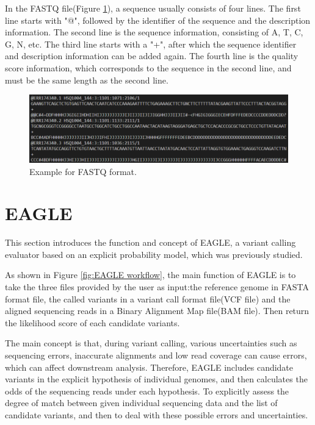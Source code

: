 \documentclass[PhD]{PHlab-thesis}
\begin{document}
In the FASTQ file(Figure \ref{fig:FASTQ format}), a sequence usually consists of four lines. The first line starts with "@", followed by the identifier of the sequence and the description information. The second line is the sequence information, consisting of A, T, C, G, N, etc. The third line starts with a "+", after which the sequence identifier and description information can be added again. The fourth line is the quality score information, which corresponds to the sequence in the second line, and must be the same length as the second line.

\begin{figure}[h!]
	\centering
	\includegraphics[scale=0.3]{figures/Example for FASTQ format.png}
	\caption{Example for FASTQ format.}
	\label{fig:FASTQ format} %
\end{figure}

\section{EAGLE}
This section introduces the function and concept of EAGLE, a variant calling evaluator based on an explicit probability model, which was previously studied.

As shown in Figure \ref{fig:EAGLE workflow}, the main function of EAGLE is to take the three files provided by the user as input:the reference genome in FASTA format file, the called variants in a variant call format file(VCF file) and the aligned sequencing reads in a Binary Alignment Map file(BAM file). Then return the likelihood score of each candidate variants.

The main concept is that, during variant calling, various uncertainties such as sequencing errors, inaccurate alignments and low read coverage can cause errors, which can affect downstream analysis. Therefore, EAGLE includes candidate variants in the explicit hypothesis of individual genomes, and then calculates the odds of the sequencing reads under each hypothesis. To explicitly assess the degree of match between given individual sequencing data and the list of candidate variants, and then to deal with these possible errors and uncertainties.
\end{document}
